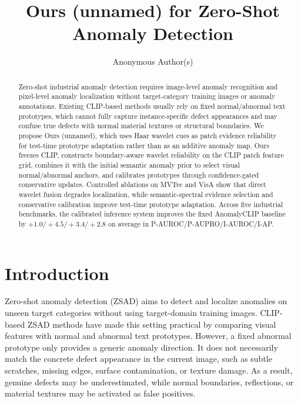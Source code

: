 \documentclass[runningheads]{llncs}
\title{Ours (unnamed) for Zero-Shot Anomaly Detection}
\author{Anonymous Author(s)}
\institute{Anonymous Institution}
\begin{document}
\maketitle

\begin{abstract}
Zero-shot industrial anomaly detection requires image-level anomaly recognition and pixel-level anomaly localization without target-category training images or anomaly annotations. Existing CLIP-based methods usually rely on fixed normal/abnormal text prototypes, which cannot fully capture instance-specific defect appearances and may confuse true defects with normal material textures or structural boundaries. We propose Ours (unnamed), which uses Haar wavelet cues as patch evidence reliability for test-time prototype adaptation rather than as an additive anomaly map. Ours freezes CLIP, constructs boundary-aware wavelet reliability on the CLIP patch feature grid, combines it with the initial semantic anomaly prior to select visual normal/abnormal anchors, and calibrates prototypes through confidence-gated conservative updates. Controlled ablations on MVTec and VisA show that direct wavelet fusion degrades localization, while semantic-spectral evidence selection and conservative calibration improve test-time prototype adaptation. Across five industrial benchmarks, the calibrated inference system improves the fixed AnomalyCLIP baseline by $+1.0/+4.5/+3.4/+2.8$ on average in P-AUROC/P-AUPRO/I-AUROC/I-AP.
\end{abstract}

\section{Introduction}

Zero-shot anomaly detection (ZSAD) aims to detect and localize anomalies on unseen target categories without using target-domain training images. CLIP-based ZSAD methods have made this setting practical by comparing visual features with normal and abnormal text prototypes. However, a fixed abnormal prototype only provides a generic anomaly direction. It does not necessarily match the concrete defect appearance in the current image, such as subtle scratches, missing edges, surface contamination, or texture damage. As a result, genuine defects may be underestimated, while normal boundaries, reflections, or material textures may be activated as false positives.
\end{document}
